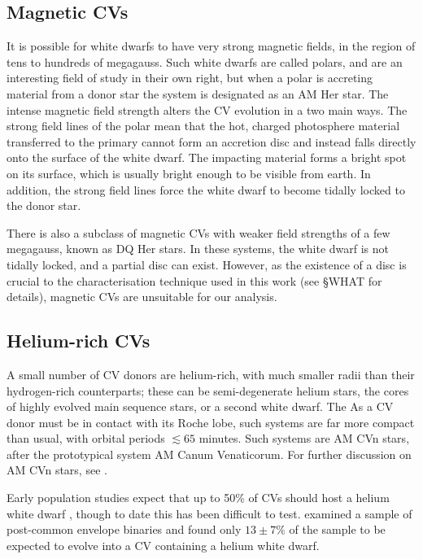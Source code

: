 \subsection{Magnetic CVs}
\label{sect:introduction:magnetic CVs}

It is possible for white dwarfs to have very strong magnetic fields, in the region of tens to hundreds of megagauss. Such white dwarfs are called polars, and are an interesting field of study in their own right, but when a polar is accreting material from a donor star the system is designated as an AM Her star. The intense magnetic field strength alters the CV evolution in a two main ways. The strong field lines of the polar mean that the hot, charged photosphere material transferred to the primary cannot form an accretion disc and instead falls directly onto the surface of the white dwarf. The impacting material forms a bright spot on its surface, which is usually bright enough to be visible from earth. In addition, the strong field lines force the white dwarf to become tidally locked to the donor star. 

There is also a subclass of magnetic CVs with weaker field strengths of a few megagauss, known as DQ Her stars. In these systems, the white dwarf is not tidally locked, and a partial disc can exist. However, as the existence of a disc is crucial to the characterisation technique used in this work (see \S WHAT for details), magnetic CVs are unsuitable for our analysis.

\subsection{Helium-rich CVs}
\label{sect:introduction:AM CVn}

A small number of CV donors are helium-rich, with much smaller radii than their hydrogen-rich counterparts; these can be semi-degenerate helium stars, the cores of highly evolved main sequence stars, or a second white dwarf. The  As a CV donor must be in contact with its Roche lobe, such systems are far more compact than usual, with orbital periods $\lesssim 65$ minutes. Such systems are AM CVn stars, after the prototypical system AM Canum Venaticorum. For further discussion on AM CVn stars, see \citep{solheim2010}.

Early population studies expect that up to 50\% of CVs should host a helium white dwarf \citep{politano1996}, though to date this has been difficult to test. \citet{zorotovic2010} examined a sample of post-common envelope binaries and found only $13\pm7\%$ of the sample to be expected to evolve into a CV containing a helium white dwarf.


